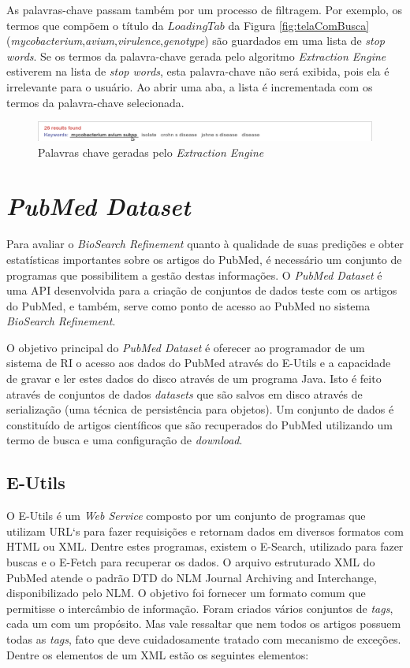 As palavras-chave passam também por um processo de filtragem. Por exemplo, os termos que compõem o título da $LoadingTab$ da Figura \ref{fig:telaComBusca} (\emph{mycobacterium},\emph{avium},\emph{virulence},\emph{genotype}) são guardados em uma lista de \emph{stop words}. Se os termos da palavra-chave gerada pelo algoritmo \emph{Extraction Engine} estiverem na lista de \emph{stop words}, esta palavra-chave não será exibida, pois ela é irrelevante para o usuário. Ao abrir uma aba, a lista é incrementada com os termos da palavra-chave selecionada.

\begin{figure}[h!]
    \center
    \includegraphics[scale=0.4]{imagens/palavrasChave.png}
    \caption{Palavras chave geradas pelo \emph{Extraction Engine} \label{fig:palavrasChave}} 
\end{figure}

\section{\emph{PubMed Dataset}}

Para avaliar o \emph{BioSearch Refinement} quanto à qualidade de suas predições e obter estatísticas importantes sobre os artigos do PubMed, é necessário um conjunto de programas que possibilitem a gestão destas informações. O \emph{PubMed Dataset} é uma API desenvolvida para a criação de conjuntos de dados teste com os artigos do PubMed, e também, serve como ponto de acesso ao PubMed no sistema \emph{BioSearch Refinement}. 

O objetivo principal do \emph{PubMed Dataset} é oferecer ao programador de um sistema de RI o acesso aos dados do PubMed através do E-Utils \cite{Eutils2010} e a capacidade de gravar e ler estes dados do disco através de um programa Java. Isto é feito através de conjuntos de dados \emph{datasets} que são salvos em disco através de serialização (uma técnica de persistência para objetos). Um conjunto de dados é constituído de artigos científicos que são recuperados do PubMed utilizando um termo de busca e uma configuração de \emph{download}.

\subsection{E-Utils}
O E-Utils é um \emph{Web Service} composto por um conjunto de programas que utilizam URL`s para fazer requisições e retornam dados em diversos formatos com HTML ou XML. Dentre estes programas, existem o E-Search, utilizado para fazer buscas e o E-Fetch para recuperar os dados. O arquivo estruturado XML do PubMed atende o padrão DTD do NLM Journal Archiving and Interchange, disponibilizado pelo NLM. O objetivo foi fornecer um formato comum que permitisse o intercâmbio de informação. Foram criados vários conjuntos de \emph{tags}, cada um com um propósito. Mas vale ressaltar que nem todos os artigos possuem todas as \emph{tags}, fato que deve cuidadosamente tratado com mecanismo de exceções. Dentre os elementos de um XML estão os seguintes elementos:

